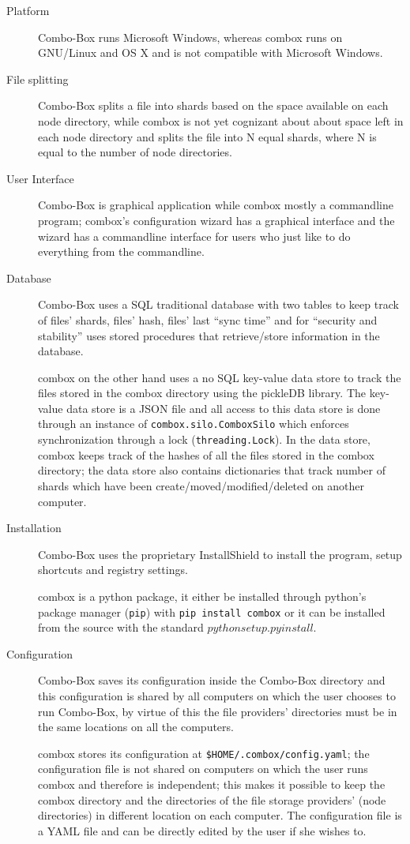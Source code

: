 \begin{description}
\item[Platform] Combo-Box runs Microsoft Windows, whereas combox runs
  on GNU/Linux and OS X and is not compatible with Microsoft Windows.
\item[File splitting] Combo-Box splits a file into shards based on the
  space available on each node directory\cite{vollmar-combo-box},
  while combox is not yet cognizant about about space left in each
  node directory and splits the file into N equal shards, where N is
  equal to the number of node directories.
\item[User Interface] Combo-Box is graphical application while combox
  mostly a commandline program; combox's configuration wizard has a
  graphical interface and the wizard has a commandline interface for
  users who just like to do everything from the commandline.
\item[Database] Combo-Box uses a SQL traditional database with two
  tables to keep track of files' shards, files' hash, files' last
  ``sync time'' and for ``security and stability'' uses stored
  procedures that retrieve/store information in the
  database\cite{vollmar-combo-box}.

  combox on the other hand uses a no SQL key-value data store to track
  the files stored in the combox directory using the pickleDB
  library\cite{pylib:pickledb}. The key-value data store is a JSON
  file and all access to this data store is done through an instance
  of \verb+combox.silo.ComboxSilo+ which enforces synchronization
  through a lock (\verb+threading.Lock+). In the data store, combox
  keeps track of the hashes of all the files stored in the combox
  directory; the data store also contains dictionaries that track
  number of shards which have been create/moved/modified/deleted on
  another computer.

\item[Installation] Combo-Box uses the proprietary
  InstallShield\cite{nonfree-installshield} to install the program,
  setup shortcuts and registry settings\cite{vollmar-combo-box}.

  combox is a python package, it either be installed through python's
  package manager (\verb+pip+\cite{py:pip}) with
  \verb+pip install combox+ or it can be installed from the source
  with the standard $python setup.py install$.

\item[Configuration] Combo-Box saves its configuration inside the
  Combo-Box directory and this configuration is shared by all
  computers on which the user chooses to run Combo-Box, by virtue of
  this the file providers' directories must be in the same locations
  on all the computers.

  combox stores its configuration at
  \verb+$HOME/.combox/config.yaml+; the configuration file is not
  shared on computers on which the user runs combox and therefore is
  independent; this makes it possible to keep the combox directory and
  the directories of the file storage providers' (node directories) in
  different location on each computer. The configuration file is a
  YAML file and can be directly edited by the user if she wishes to.
\end{description}

